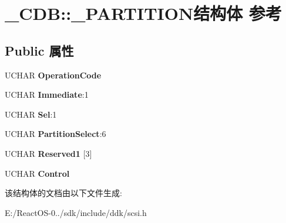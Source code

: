 \hypertarget{struct___c_d_b_1_1___p_a_r_t_i_t_i_o_n}{}\section{\+\_\+\+C\+DB\+:\+:\+\_\+\+P\+A\+R\+T\+I\+T\+I\+O\+N结构体 参考}
\label{struct___c_d_b_1_1___p_a_r_t_i_t_i_o_n}
\subsection*{Public 属性}
\begin{DoxyCompactItemize}
\item 
\mbox{\label{struct___c_d_b_1_1___p_a_r_t_i_t_i_o_n_a1b429f0fce6a1e82e20a1ace7254c10e}} 
U\+C\+H\+AR {\bfseries Operation\+Code}
\item 
\mbox{\label{struct___c_d_b_1_1___p_a_r_t_i_t_i_o_n_a529f6193718ac6b6ce5f0b7a79310d9c}} 
U\+C\+H\+AR {\bfseries Immediate}\+:1
\item 
\mbox{\label{struct___c_d_b_1_1___p_a_r_t_i_t_i_o_n_aedacb92fcc4bce1d6d8e40abc102872e}} 
U\+C\+H\+AR {\bfseries Sel}\+:1
\item 
\mbox{\label{struct___c_d_b_1_1___p_a_r_t_i_t_i_o_n_a04d99cd2bd1e3efc370b951f489941f5}} 
U\+C\+H\+AR {\bfseries Partition\+Select}\+:6
\item 
\mbox{\label{struct___c_d_b_1_1___p_a_r_t_i_t_i_o_n_a22b778b23d1770cd6a02f3baff02ce65}} 
U\+C\+H\+AR {\bfseries Reserved1} \mbox{[}3\mbox{]}
\item 
\mbox{\label{struct___c_d_b_1_1___p_a_r_t_i_t_i_o_n_a1e17cc64f7e35ae22e6e60ad59e980d2}} 
U\+C\+H\+AR {\bfseries Control}
\end{DoxyCompactItemize}


该结构体的文档由以下文件生成\+:\begin{DoxyCompactItemize}
\item 
E\+:/\+React\+O\+S-\/0../sdk/include/ddk/scsi.\+h\end{DoxyCompactItemize}
